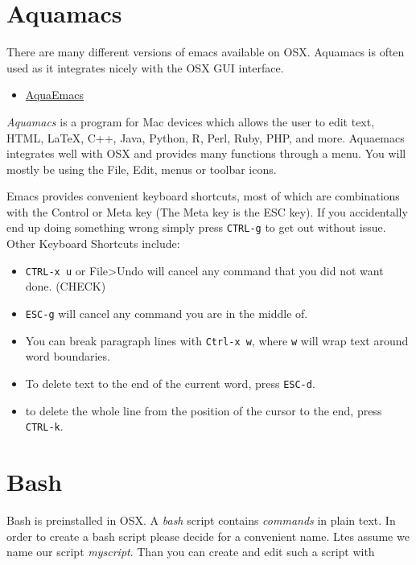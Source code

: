 \section{Aquamacs}\label{aquamacs}

There are many different versions of emacs available on OSX. Aquamacs is
often used as it integrates nicely with the OSX GUI interface.

\begin{itemize}

\item
  \href{http://aquamacs.org/download.shtml}{AquaEmacs}
\end{itemize}

\emph{Aquamacs} is a program for Mac devices which allows the user to
edit text, HTML, LaTeX, C++, Java, Python, R, Perl, Ruby, PHP, and more.
Aquaemacs integrates well with OSX and provides many functions through a
menu. You will mostly be using the File, Edit, menus or toolbar icons.

Emacs provides convenient keyboard shortcuts, most of which are
combinations with the Control or Meta key (The Meta key is the ESC key).
If you accidentally end up doing something wrong simply press
\texttt{CTRL-g} to get out without issue. Other Keyboard Shortcuts
include:

\begin{itemize}
\item
  \texttt{CTRL-x\ u} or File\textgreater{}Undo will cancel any command
  that you did not want done. (CHECK)
\item
  \texttt{ESC-g} will cancel any command you are in the middle of.
\item
  You can break paragraph lines with \texttt{Ctrl-x\ w}, where
  \texttt{w} will wrap text around word boundaries.
\item
  To delete text to the end of the current word, press \texttt{ESC-d}.
\item
  to delete the whole line from the position of the cursor to the end,
  press \texttt{CTRL-k}.
\end{itemize}

\section{Bash}\label{bash}

Bash is preinstalled in OSX. A \emph{bash} script contains
\emph{commands} in plain text. In order to create a bash script please
decide for a convenient name. Ltes assume we name our script
\emph{myscript}. Than you can create and edit such a script with

